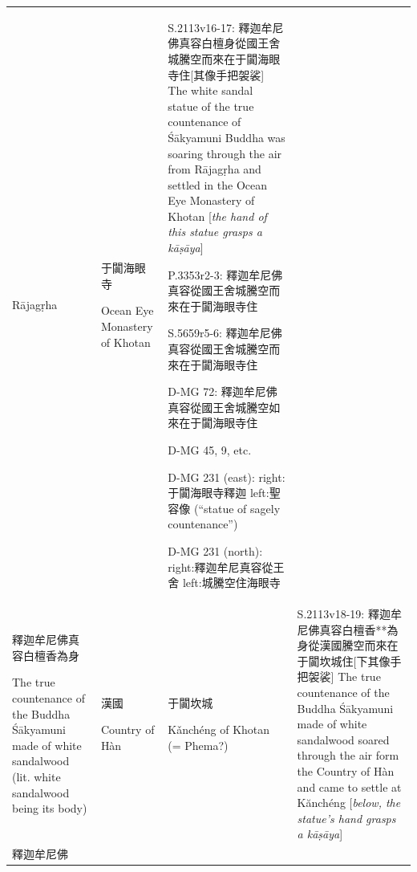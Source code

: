 \documentclass[
  english,
  a4paper,
  DIV=12,
  footlines=2.1,
  usegeometry=true]{scrartcl}
\begin{document}
\begin{longtable}[]{@{}llll@{}}
\begin{minipage}[t]{0.13\columnwidth}
Rājagṛha\strut
\end{minipage} & \begin{minipage}[t]{0.13\columnwidth}\raggedright
于闐海眼寺

Ocean Eye Monastery of Khotan\strut
\end{minipage} & \begin{minipage}[t]{0.44\columnwidth}\raggedright
S.2113v16-17:
釋迦牟尼佛真容白檀身從國王舍城騰空而來在于闐海眼寺住{[}其像手把袈裟{]}
The white sandal statue of the true countenance of Śākyamuni Buddha was
soaring through the air from Rājagṛha and settled in the Ocean Eye
Monastery of Khotan {[}\emph{the hand of this statue grasps a kāṣāya}{]}

P.3353r2-3: 釋迦牟尼佛真容從國王舍城騰空而來在于闐海眼寺住

S.5659r5-6: 釋迦牟尼佛真容從國王舍城騰空而來在于闐海眼寺住

D-MG 72: 釋迦牟尼佛真容從國王舍城騰空如來在于闐海眼寺住

D-MG 45, 9, etc.

D-MG 231 (east): right:于闐海眼寺釋迦 left:聖容像 (``statue of sagely
countenance'')

D-MG 231 (north): right:釋迦牟尼真容從王舍 left:城騰空住海眼寺\strut
\end{minipage}\tabularnewline
\begin{minipage}[t]{0.18\columnwidth}\raggedright
釋迦牟尼佛真容白檀香為身

The true countenance of the Buddha Śākyamuni made of white sandalwood
(lit. white sandalwood being its body)\strut
\end{minipage} & \begin{minipage}[t]{0.13\columnwidth}\raggedright
漢國

Country of Hàn\strut
\end{minipage} & \begin{minipage}[t]{0.13\columnwidth}\raggedright
于闐坎城

Kǎnchéng of Khotan (= Phema?)\strut
\end{minipage} & \begin{minipage}[t]{0.44\columnwidth}\raggedright
S.2113v18-19:
釋迦牟尼佛真容白檀香**為身從漢國騰空而來在于闐坎城住{[}下其像手把袈裟{]}
The true countenance of the Buddha Śākyamuni made of white sandalwood
soared through the air form the Country of Hàn and came to settle at
Kănchéng {[}\emph{below, the statue's hand grasps a kāṣāya}{]}\strut
\end{minipage}\tabularnewline
\begin{minipage}[t]{0.18\columnwidth}\raggedright
釋迦牟尼佛


\end{minipage}
\end{longtable}
\end{document}
